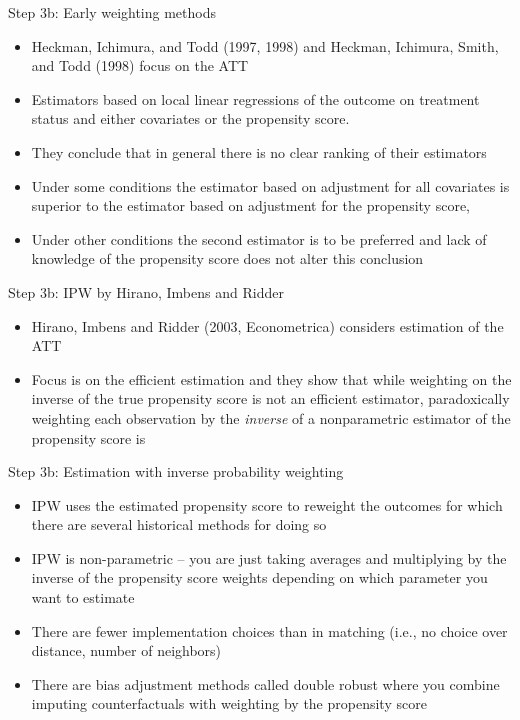 \documentclass{beamer}
\begin{document}
\begin{frame}{Step 3b: Early weighting methods}

\begin{itemize} 
\item Heckman, Ichimura, and Todd (1997, 1998) and Heckman, Ichimura, Smith,
and Todd (1998) focus on the ATT
\item Estimators based on local linear regressions of the outcome on treatment status and either covariates or the propensity score. 
\item They conclude that in general there is no clear ranking of their estimators 
\item Under some conditions the estimator based on adjustment for all covariates is superior to the estimator based on adjustment for the propensity score, \item Under other conditions the second estimator is to be preferred and lack of knowledge of the propensity score does not alter this conclusion
\end{itemize}

\end{frame}

	

\begin{frame}{Step 3b: IPW by Hirano, Imbens and Ridder}

\begin{itemize} 
\item Hirano, Imbens and Ridder (2003, Econometrica) considers estimation of the ATT
\item Focus is on the efficient estimation and they show that while weighting on the inverse of the true propensity score is not an efficient estimator, paradoxically weighting each observation by the \emph{inverse} of a nonparametric estimator of the propensity score is
\end{itemize}

\end{frame}


\begin{frame}{Step 3b: Estimation with inverse probability weighting}

\begin{itemize}
	\item IPW uses the estimated propensity score to reweight the outcomes for which there are several historical methods for doing so
	\item IPW is non-parametric -- you are just taking averages and multiplying by the inverse of the propensity score weights depending on which parameter you want to estimate
	\item There are fewer implementation choices than in matching (i.e., no choice over distance, number of neighbors)
	\item There are bias adjustment methods called double robust where you combine imputing counterfactuals with weighting by the propensity score
\end{itemize}

\end{frame}
	
\end{document}
